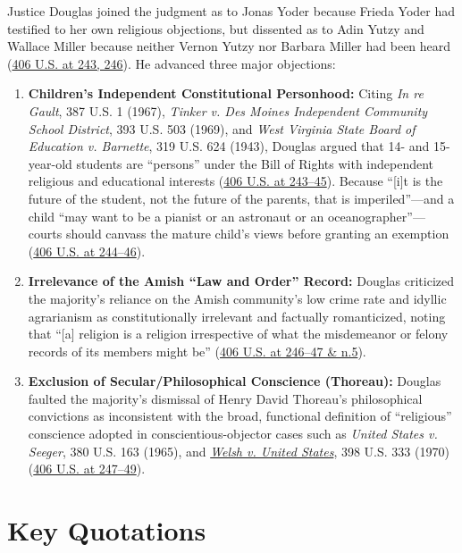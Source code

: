 \documentclass[12pt]{article}
\begin{document}
Justice Douglas joined the judgment as to Jonas Yoder because Frieda Yoder had testified to her own religious objections, but dissented as to Adin Yutzy and Wallace Miller because neither Vernon Yutzy nor Barbara Miller had been heard (\href{https://supreme.justia.com/cases/federal/us/406/205/}{406 U.S. at 243, 246}). He advanced three major objections:
\begin{enumerate}
  \item \textbf{Children's Independent Constitutional Personhood:} Citing \emph{In re Gault}, 387 U.S. 1 (1967), \emph{Tinker v. Des Moines Independent Community School District}, 393 U.S. 503 (1969), and \emph{West Virginia State Board of Education v. Barnette}, 319 U.S. 624 (1943), Douglas argued that 14- and 15-year-old students are ``persons'' under the Bill of Rights with independent religious and educational interests (\href{https://supreme.justia.com/cases/federal/us/406/205/}{406 U.S. at 243--45}). Because ``[i]t is the future of the student, not the future of the parents, that is imperiled''---and a child ``may want to be a pianist or an astronaut or an oceanographer''---courts should canvass the mature child's views before granting an exemption (\href{https://supreme.justia.com/cases/federal/us/406/205/}{406 U.S. at 244--46}).
  \item \textbf{Irrelevance of the Amish ``Law and Order'' Record:} Douglas criticized the majority's reliance on the Amish community's low crime rate and idyllic agrarianism as constitutionally irrelevant and factually romanticized, noting that ``[a] religion is a religion irrespective of what the misdemeanor or felony records of its members might be'' (\href{https://supreme.justia.com/cases/federal/us/406/205/}{406 U.S. at 246--47 \& n.5}).
  \item \textbf{Exclusion of Secular/Philosophical Conscience (Thoreau):} Douglas faulted the majority's dismissal of Henry David Thoreau's philosophical convictions as inconsistent with the broad, functional definition of ``religious'' conscience adopted in conscientious-objector cases such as \emph{United States v. Seeger}, 380 U.S. 163 (1965), and \href{https://supreme.justia.com/cases/federal/us/398/333/}{\emph{Welsh v. United States}}, 398 U.S. 333 (1970) (\href{https://supreme.justia.com/cases/federal/us/406/205/}{406 U.S. at 247--49}).
\end{enumerate}

\section{Key Quotations}
\end{document}
